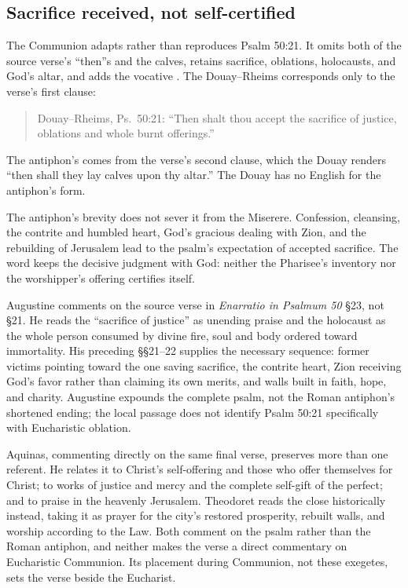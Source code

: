 \subsection*{Sacrifice received, not self-certified\enspace{}}

The Communion adapts rather than reproduces Psalm 50:21. It omits both of the
source verse's ``then''s and the calves, retains sacrifice, oblations,
holocausts, and God's altar, and adds the vocative . The
Douay--Rheims corresponds only to the verse's first clause:

\begin{quote}

\medskip
Douay--Rheims, Ps.~50:21: ``Then shalt thou accept the sacrifice of justice,
oblations and whole burnt offerings.''
\end{quote}

\noindent The antiphon's  comes from the verse's
second clause, which the Douay renders ``then shall they lay calves upon thy
altar.'' The Douay has no English for the antiphon's form.

The antiphon's brevity does not sever it from the Miserere. Confession,
cleansing, the contrite and humbled heart, God's gracious dealing with Zion,
and the rebuilding of Jerusalem lead to the psalm's expectation of accepted
sacrifice. The word  keeps the decisive judgment with God:
neither the Pharisee's inventory nor the worshipper's offering certifies
itself.

Augustine comments on the source verse in \emph{Enarratio in Psalmum 50}
\S23, not \S21. He reads the ``sacrifice of justice'' as unending praise and
the holocaust as the whole person consumed by divine fire, soul and body
ordered toward immortality. His preceding \S\S21--22 supplies the necessary
sequence: former victims pointing toward the one saving sacrifice, the
contrite heart, Zion receiving God's favor rather than claiming its own
merits, and walls built in faith, hope, and charity. Augustine expounds the
complete psalm, not the Roman antiphon's shortened ending; the local passage
does not identify Psalm 50:21 specifically with Eucharistic oblation.

Aquinas, commenting directly on the same final verse, preserves more than one
referent. He relates it to Christ's self-offering and those who offer
themselves for Christ; to works of justice and mercy and the complete
self-gift of the perfect; and to praise in the heavenly Jerusalem. Theodoret
reads the close historically instead, taking it as prayer for the city's
restored prosperity, rebuilt walls, and worship according to the Law. Both
comment on the psalm rather than the Roman antiphon, and neither makes the
verse a direct commentary on Eucharistic Communion. Its placement during
Communion, not these exegetes, sets the verse beside the Eucharist.

